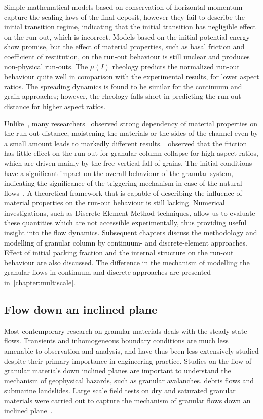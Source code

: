 Simple mathematical models based on conservation of horizontal momentum capture 
the scaling laws of the final deposit, however they fail to describe the 
initial transition regime, indicating that the initial transition has 
negligible effect on the run-out, which is incorrect. Models based on the 
initial potential energy show promise, but the effect of material properties, 
such as basal friction and coefficient of restitution, on the run-out behaviour 
is still unclear and produces non-physical run-outs. The $\mu(\textit{I})$ 
rheology predicts the normalized run-out behaviour quite well in comparison 
with the experimental results, for lower aspect ratios. The spreading dynamics 
is found to be similar for the continuum and grain approaches; however, the 
rheology falls short in predicting the run-out distance for higher aspect 
ratios. 

Unlike~\citet{Lube2005}, many 
researchers~\citep{Balmforth2005,Kerswell2005} observed strong dependency of 
material properties on the run-out distance, moistening the materials or the 
sides of the channel even by a small amount leads to markedly different 
results.~\citet{Staron2007a} observed that the friction has little effect on 
the run-out for granular column collapse for high aspect ratios, which are 
driven mainly by the free vertical fall of grains. The initial conditions have 
a significant impact on the overall behaviour of the granular system, 
indicating the significance of the triggering mechanism in case of the natural 
flows~\citep{Staron2007a}. A theoretical framework that is capable of 
describing the influence of material properties on the run-out behaviour is 
still lacking. Numerical investigations, such as Discrete Element 
Method techniques, allow us to evaluate these quantities which are not 
accessible experimentally, thus providing useful insight into the flow 
dynamics. Subsequent chapters discuss the methodology and modelling of granular 
column by continuum- and discrete-element approaches. Effect of initial packing 
fraction and the internal structure on the run-out behaviour are also 
discussed. The difference in the mechanism of modelling the granular flows in 
continuum and discrete approaches are presented in~\cref{chapter:multiscale}.

\subsection{Flow down an inclined plane}

Most contemporary research on granular materials deals
with the steady-state flows. Transients and inhomogeneous boundary conditions 
are much less amenable to observation and analysis, and have thus been less 
extensively studied despite their primary importance in engineering practice. 
Studies on the flow of granular materials down inclined planes are important to 
understand the mechanism of geophysical hazards, such as granular avalanches, 
debris flows and submarine landslides. Large scale field tests on dry and 
saturated granular materials were carried out to capture the mechanism of 
granular flows down an inclined plane~\citep{Okada2008,Denlinger2001}.


